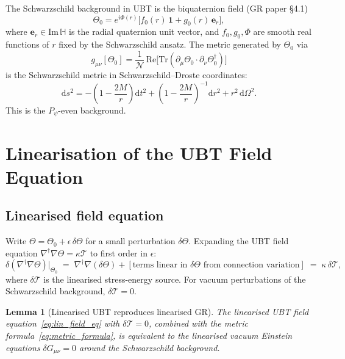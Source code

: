 \documentclass[12pt,a4paper]{article}
\newtheorem{lemma}[theorem]{Lemma}
\theoremstyle{definition}
\theoremstyle{remark}
\newcommand{\HH}{\mathbb{H}}
\newcommand{\calN}{\mathcal{N}}
\newcommand{\dd}{\mathrm{d}}
\newcommand{\re}{\mathrm{Re}}
\newcommand{\Tr}{\mathrm{Tr}}
\begin{document}
The Schwarzschild background in UBT is the biquaternion field (GR paper §4.1)
\begin{equation}
\label{eq:Theta0}
  \Theta_0 = e^{i\Phi(r)}\bigl[f_0(r)\,\mathbf{1} + g_0(r)\,\boldsymbol{e}_r\bigr],
\end{equation}
where $\boldsymbol{e}_r \in \mathrm{Im}\,\HH$ is the radial quaternion unit
vector, and $f_0, g_0, \Phi$ are smooth real functions of $r$ fixed by the
Schwarzschild ansatz.  The metric generated by $\Theta_0$ via
\begin{equation}
\label{eq:metric_formula}
  g_{\mu\nu}[\Theta_0]
  = \frac{1}{\calN}\,\re\bigl[\Tr(\partial_\mu\Theta_0\cdot\partial_\nu\Theta_0^\dagger)\bigr]
\end{equation}
is the Schwarzschild metric in Schwarzschild--Droste coordinates:
\begin{equation}
\label{eq:schwarzschild_metric}
  \dd s^2
  = -\left(1-\frac{2M}{r}\right)\dd t^2
    + \left(1-\frac{2M}{r}\right)^{-1}\dd r^2
    + r^2\,\dd\Omega^2.
\end{equation}
This is the $P_\psi$-even background.

\section{Linearisation of the UBT Field Equation}
\label{sec:linearisation}

\subsection{Linearised field equation}

Write $\Theta = \Theta_0 + \epsilon\,\delta\Theta$ for a small perturbation
$\delta\Theta$.  Expanding the UBT field equation
$\nabla^\dagger\nabla\Theta = \kappa\mathcal{T}$ to first order in $\epsilon$:
\begin{equation}
\label{eq:lin_field_eq}
  \delta(\nabla^\dagger\nabla\Theta)\big|_{\Theta_0}
  \;=\;
  \nabla^\dagger\nabla(\delta\Theta)
  + [\text{terms linear in }\delta\Theta\text{ from connection variation}]
  \;=\;
  \kappa\,\delta\mathcal{T},
\end{equation}
where $\delta\mathcal{T}$ is the linearised stress-energy source.  For vacuum
perturbations of the Schwarzschild background, $\delta\mathcal{T} = 0$.

\begin{lemma}[Linearised UBT reproduces linearised GR]
\label{lem:lin_ubt_gr}
The linearised UBT field equation~\eqref{eq:lin_field_eq} with
$\delta\mathcal{T} = 0$, combined with the metric
formula~\eqref{eq:metric_formula}, is equivalent to the linearised vacuum
Einstein equations $\delta G_{\mu\nu} = 0$ around the Schwarzschild background.
\end{lemma}
\end{document}
